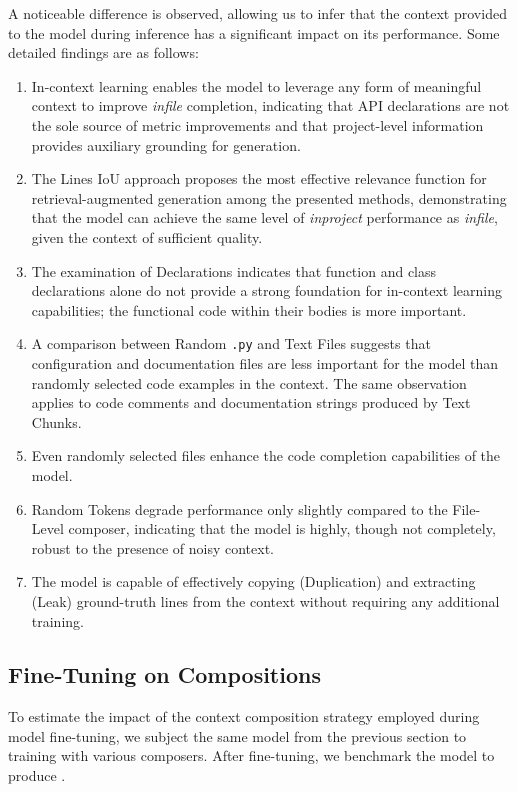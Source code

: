 A noticeable difference is observed, allowing us to infer that the context provided to the model during inference has a significant impact on its performance. Some detailed findings are as follows:

\begin{enumerate}
\item In-context learning enables the model to leverage any form of meaningful context to improve \textit{infile} completion, indicating that API declarations are not the sole source of metric improvements and that project-level information provides auxiliary grounding for generation.
\item The Lines IoU approach proposes the most effective relevance function for retrieval-augmented generation among the presented methods, demonstrating that the model can achieve the same level of \textit{inproject} performance as \textit{infile}, given the context of sufficient quality.
\item The examination of Declarations indicates that function and class declarations alone do not provide a strong foundation for in-context learning capabilities; the functional code within their bodies is more important.
\item A comparison between Random \texttt{.py} and Text Files suggests that configuration and documentation files are less important for the model than randomly selected code examples in the context. The same observation applies to code comments and documentation strings produced by Text Chunks.
\item Even randomly selected files enhance the code completion capabilities of the model.
\item Random Tokens degrade performance only slightly compared to the File-Level composer, indicating that the model is highly, though not completely, robust to the presence of noisy context.
\item The model is capable of effectively copying (Duplication) and extracting (Leak) ground-truth lines from the context without requiring any additional training.
\end{enumerate}

\subsection{Fine-Tuning on Compositions}\label{sec:fine-tuning-on-compositions}

To estimate the impact of the context composition strategy employed during model fine-tuning, we subject the same model from the previous section to training with various composers. After fine-tuning, we benchmark the model to produce .

